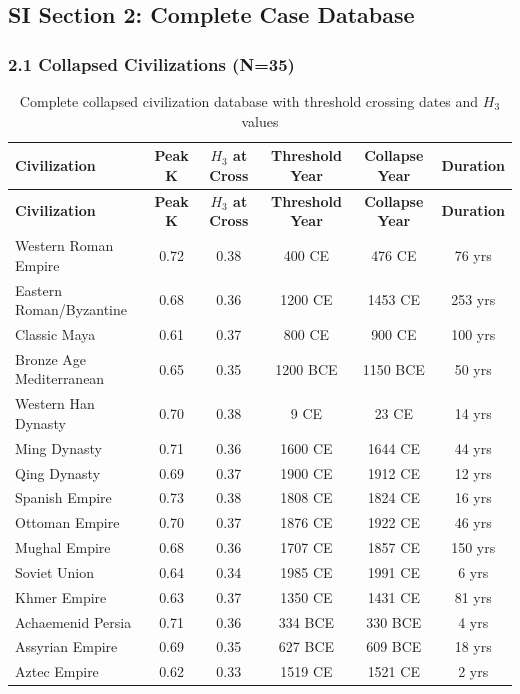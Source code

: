 \documentclass[11pt,a4paper]{article}
\newcommand{\Hthree}{H_3}
\begin{document}
\subsection{SI Section 2: Complete Case Database}

\subsubsection{2.1 Collapsed Civilizations (N=35)}

\begin{longtable}{lccccc}
\caption{Complete collapsed civilization database with threshold crossing dates and $\Hthree$ values} \\
\toprule
\textbf{Civilization} & \textbf{Peak K} & \textbf{$\Hthree$ at Cross} & \textbf{Threshold Year} & \textbf{Collapse Year} & \textbf{Duration} \\
\midrule
\endfirsthead
\toprule
\textbf{Civilization} & \textbf{Peak K} & \textbf{$\Hthree$ at Cross} & \textbf{Threshold Year} & \textbf{Collapse Year} & \textbf{Duration} \\
\midrule
\endhead
Western Roman Empire & 0.72 & 0.38 & 400 CE & 476 CE & 76 yrs \\
Eastern Roman/Byzantine & 0.68 & 0.36 & 1200 CE & 1453 CE & 253 yrs \\
Classic Maya & 0.61 & 0.37 & 800 CE & 900 CE & 100 yrs \\
Bronze Age Mediterranean & 0.65 & 0.35 & 1200 BCE & 1150 BCE & 50 yrs \\
Western Han Dynasty & 0.70 & 0.38 & 9 CE & 23 CE & 14 yrs \\
Ming Dynasty & 0.71 & 0.36 & 1600 CE & 1644 CE & 44 yrs \\
Qing Dynasty & 0.69 & 0.37 & 1900 CE & 1912 CE & 12 yrs \\
Spanish Empire & 0.73 & 0.38 & 1808 CE & 1824 CE & 16 yrs \\
Ottoman Empire & 0.70 & 0.37 & 1876 CE & 1922 CE & 46 yrs \\
Mughal Empire & 0.68 & 0.36 & 1707 CE & 1857 CE & 150 yrs \\
Soviet Union & 0.64 & 0.34 & 1985 CE & 1991 CE & 6 yrs \\
Khmer Empire & 0.63 & 0.37 & 1350 CE & 1431 CE & 81 yrs \\
Achaemenid Persia & 0.71 & 0.36 & 334 BCE & 330 BCE & 4 yrs \\
Assyrian Empire & 0.69 & 0.35 & 627 BCE & 609 BCE & 18 yrs \\
Aztec Empire & 0.62 & 0.33 & 1519 CE & 1521 CE & 2 yrs \\

\end{longtable}
\end{document}
